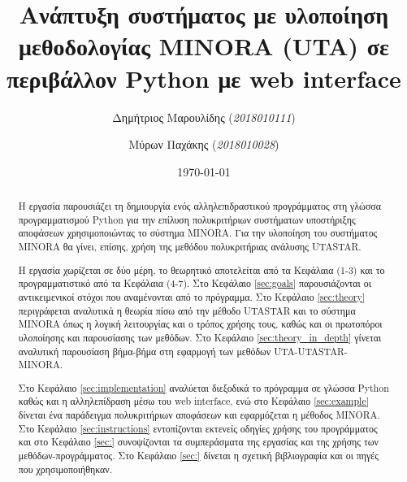 \documentclass[11pt,a4paper,titlepage]{article}
\author{Δημήτριος Μαρουλίδης (\textit{2018010111}) \and
    Μύρων Παχάκης (\textit{2018010028})}
\title{Ανάπτυξη συστήματος με υλοποίηση μεθοδολογίας MINORA (UTA) σε περιβάλλον Python με web interface}
\date{\today}
\numberwithin{equation}{section}
\begin{document}
\maketitle	
\tableofcontents

\clearpage

\begin{abstract}
Η εργασία παρουσιάζει τη δημιουργία ενός αλληλεπιδραστικού προγράμματος στη γλώσσα προγραμματισμού Python για την επίλυση πολυκριτήριων συστήματων υποστήριξης αποφάσεων χρησιμοποιώντας το σύστημα MINORA. Για την υλοποίηση του συστήματος MINORA θα γίνει, επίσης, χρήση της μεθόδου πολυκριτήριας ανάλυσης UTASTAR. 

Η εργασία χωρίζεται σε δύο μέρη, το θεωρητικό αποτελείται από τα Κεφάλαια (1-3) και το προγραμματιστικό από τα Κεφάλαια (4-7). Στο Κεφάλαιο \ref{sec:goals} παρουσιάζονται οι αντικειμενικοί στόχοι που αναμένονται από το πρόγραμμα. Στο Κεφάλαιο \ref{sec:theory} περιγράφεται αναλυτικά η θεωρία πίσω από την μέθοδο UTASTAR και το σύστημα MINORA όπως η λογική λειτουργίας και ο τρόπος χρήσης τους, καθώς και οι πρωτοπόροι υλοποίησης και παρουσίασης των μεθόδων. Στο Κεφάλαιο \ref{sec:theory_in_depth} γίνεται αναλυτική παρουσίαση βήμα-βήμα στη εφαρμογή των μεθόδων UTA-UTASTAR-MINORA.

Στο Κεφάλαιο \ref{sec:implementation} αναλύεται διεξοδικά το πρόγραμμα σε γλώσσα Python καθώς και η αλληλεπίδραση μέσω του web interface, ενώ στο Κεφάλαιο \ref{sec:example} δίνεται ένα παράδειγμα πολυκριτήριων αποφάσεων και εφαρμόζεται η μέθοδος MINORA. Στο Κεφάλαιο \ref{sec:instructions} εντοπίζονται εκτενείς οδηγίες χρήσης του προγράμματος και στο Κεφάλαιο \ref{sec:} συνοψίζονται τα συμπεράσματα της εργασίας και της χρήσης των μεθόδων-προγράμματος. Στο Κεφάλαιο \ref{sec:} δίνεται η σχετική βιβλιογραφία και οι πηγές που χρησιμοποιήθηκαν.
\end{abstract}
\end{document}
